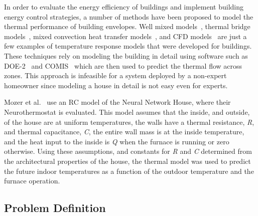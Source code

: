 In order to evaluate the energy efficiency of buildings and implement building
energy control strategies, a number of methods have been proposed to model the
thermal performance of building envelopes. Well mixed
models~\cite{haves1998standard, ahmed1996model}, thermal bridge
models~\cite{carpenter2001advances}, mixed convection heat transfer
models~\cite{beausoleil1999modelling}, and CFD models~\cite{peng1996modeling,
ratnam1998advanced} are just a few examples of temperature response models that
were developed for buildings. These techniques rely on modeling the building in
detail using software such as DOE-2~\cite{birdsall1990overview} and
COMIS~\cite{feustel1999comis} which are then used to predict the thermal flow
across zones. This approach is infeasible for a system deployed by a non-expert
homeowner since modeling a house in detail is not easy even for experts.

Mozer et al.~\cite{mozer1997neurothermostat} use an RC model of the Neural
Network House, where their Neurothermostat is evaluated. This model assumes that
the inside, and outside, of the house are at uniform temperatures, the walls
have a thermal resistance, {\em R}, and thermal capacitance, {\em C}, the entire
wall mass is at the inside temperature, and the heat input to the inside is {\em
  Q} when the furnace is running or zero otherwise. Using these assumptions, and
constants for {\em R} and {\em C} determined from the architectural properties
of the house, the thermal model was used to predict the future indoor
temperatures as a function of the outdoor temperature and the furnace
operation. 

\subsection{Problem Definition}
\label{sec:problem}


